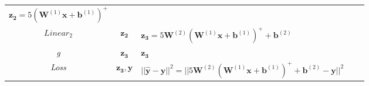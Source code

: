 \documentclass{article}
\begin{document}
\begin{enumerate}
\begin{table}[]
\begin{tcolorbox}
\begin{tabular}{|c|c|l|cc}
              $\bm{z_2}=5(\bm{W}^{(1)}\bm{x}+\bm{b}^{(1)})^+$ &                &                      \\
              \cline{1-3}
              \textit{$Linear_2$}                             & $\bm{z_2}$     &
              $\bm{z_3}=5\bm{W}^{(2)}(\bm{W}^{(1)}\bm{x}+\bm{b}^{(1)})^++\bm{b}^{(2)}$
                                                              &                &                      \\ \cline{1-3}
              \textit{g}                                      & $\bm{z_3}$     & $\bm{z_3}$
                                                              &                &                      \\ \cline{1-3}
              \textit{Loss}                                   & $\bm{z_3, y}$  &
              $||\bm{\hat{y}-y}||^2=||5\bm{W}^{(2)}(\bm{W}^{(1)}\bm{x}+\bm{b}^{(1)})^++\bm{b}^{(2)}-\bm{y}||^2$
                                                              &                &                      \\ \cline{1-3}
            \end{tabular}
          \end{tcolorbox}
        \end{table}


\end{enumerate}
\end{document}
